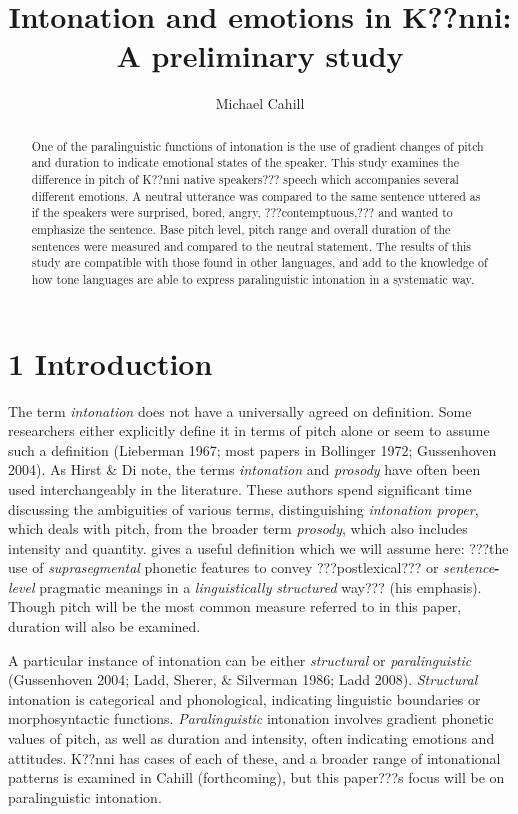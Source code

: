 \documentclass[output=paper]{langsci/langscibook}
\title{Intonation and emotions in {K??nni}: {A} preliminary study}
\author{%
 Michael Cahill\affiliation{Cahill affiliation} 
}
\begin{document}
\begin{abstract}
One of the paralinguistic functions of intonation is the use of gradient changes of pitch and duration to indicate emotional states of the speaker. This study examines the difference in pitch of K??nni native speakers??? speech which accompanies several different emotions. A neutral utterance was compared to the same sentence uttered as if the speakers were surprised, bored, angry, ???contemptuous,??? and wanted to emphasize the sentence. Base pitch level, pitch range and overall duration of the sentences were measured and compared to the neutral statement. The results of this study are compatible with those found in other languages, and add to the knowledge of how tone languages are able to express paralinguistic intonation in a systematic way.
\end{abstract}

\chapter{1 Introduction}
\begin{styleBodyTextIndent}
The term \emph{intonation} does not have a universally agreed on definition. Some researchers either explicitly define it in terms of pitch alone or seem to assume such a definition (Lieberman 1967; most papers in Bollinger 1972; Gussenhoven 2004). As Hirst \& Di\citet[3]{Canio1998} note, the terms \emph{intonation} and \emph{prosody} have often been used interchangeably in the literature. These authors spend significant time discussing the ambiguities of various terms, distinguishing \emph{intonation proper}, which deals with pitch, from the broader term \emph{prosody},\emph{ }which also includes intensity and quantity. \citet[4]{Ladd2008} gives a useful definition which we will assume here: ???the use of \emph{suprasegmental} phonetic features to convey ???postlexical??? or \emph{sentence}\textbf{{}-}\emph{level}\textbf{ }pragmatic meanings in a \emph{linguistically}\textbf{ }\emph{structured}\textbf{ }way??? (his emphasis). Though pitch will be the most common measure referred to in this paper, duration will also be examined. 
\end{styleBodyTextIndent}

A particular instance of intonation can be either \emph{structural} or \emph{paralinguistic} (Gussenhoven 2004; Ladd, Sherer, \& Silverman 1986; Ladd 2008). \emph{Structural} intonation is categorical and phonological, indicating linguistic boundaries or morphosyntactic functions. \emph{Paralinguistic} intonation involves gradient phonetic values of pitch, as well as duration and intensity, often indicating emotions and attitudes. K??nni has cases of each of these, and a broader range of intonational patterns is examined in Cahill (forthcoming), but this paper???s focus will be on paralinguistic intonation.
\end{document}
